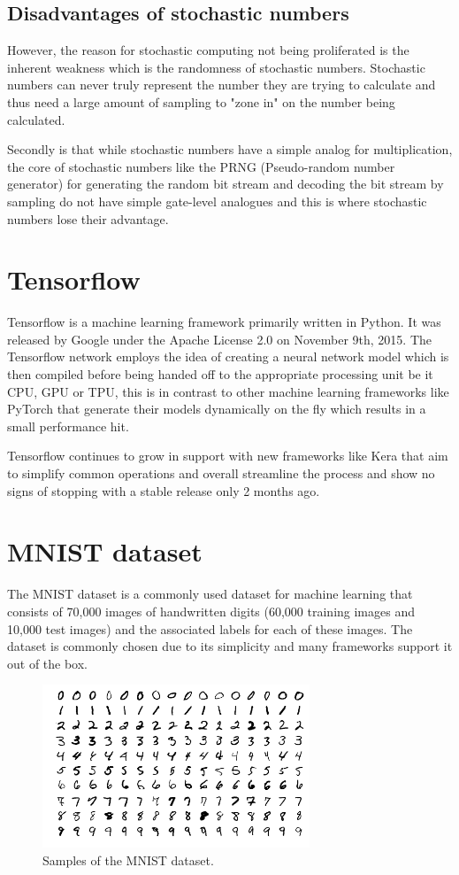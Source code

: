\documentclass[a4paper,oneside,phd,etd]{BYUPhys}
\begin{document}
\subsection{Disadvantages of stochastic numbers}
However, the reason for stochastic computing not being proliferated is the inherent weakness which is the randomness of stochastic numbers. Stochastic numbers can never truly represent the number they are trying to calculate and thus need a large amount of sampling to "zone in" on the number being calculated.

Secondly is that while stochastic numbers have a simple analog for multiplication, the core of stochastic numbers like the PRNG (Pseudo-random number generator) for generating the random bit stream and decoding the bit stream by sampling do not have simple gate-level analogues and this is where stochastic numbers lose their advantage.

\section{Tensorflow}
Tensorflow\cite{tensorflow} is a machine learning framework primarily written in Python. It was released by Google under the Apache License 2.0 on November 9th, 2015. The Tensorflow network employs the idea of creating a neural network model which is then compiled before being handed off to the appropriate processing unit be it CPU, GPU or TPU, this is in contrast to other machine learning frameworks like PyTorch that generate their models dynamically on the fly which results in a small performance hit.

Tensorflow continues to grow in support with new frameworks like Kera that aim to simplify common operations and overall streamline the process and show no signs of stopping with a stable release only 2 months ago.

\section{MNIST dataset}
The MNIST dataset\cite{lecun-website} is a commonly used dataset for machine learning that consists of 70,000 images of handwritten digits (60,000 training images and 10,000 test images) and the associated labels for each of these images. The dataset is commonly chosen due to its simplicity and many frameworks support it out of the box.
\begin{figure}[H]
\centering
\includegraphics[width=8cm]{pictures/mnist.png}
\caption{Samples of the MNIST dataset.}
\label{fig:mnist}
\end{figure}
\end{document}
